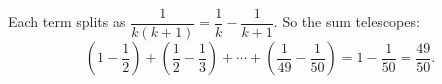 Each term splits as $\dfrac{1}{k(k+1)}=\dfrac{1}{k}-\dfrac{1}{k+1}$. So the sum telescopes:
\[
\left(1-\dfrac{1}{2}\right)+\left(\dfrac{1}{2}-\dfrac{1}{3}\right)+\cdots+\left(\dfrac{1}{49}-\dfrac{1}{50}\right)=1-\dfrac{1}{50}=\boxed{\dfrac{49}{50}}.
\]

